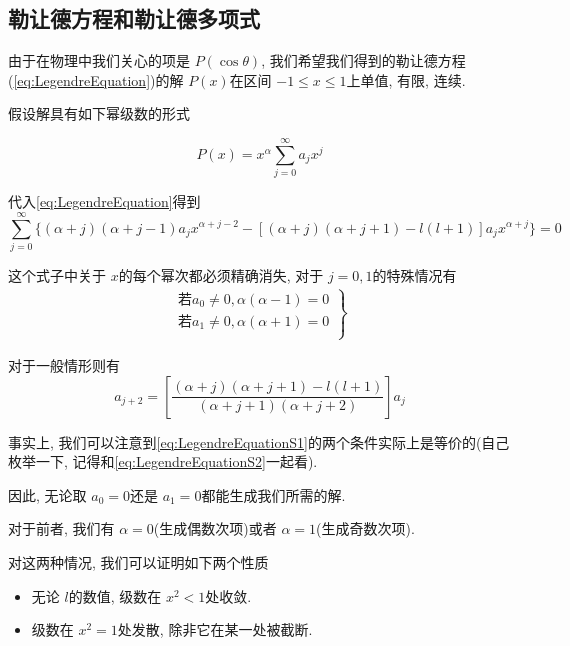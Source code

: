\subsection{勒让德方程和勒让德多项式}

由于在物理中我们关心的项是 $P(\cos\theta)$, 我们希望我们得到的勒让德方程(\cref{eq:LegendreEquation})的解 $P(x)$在区间 $-1\le x\le 1$上单值, 有限, 连续.

假设解具有如下幂级数的形式

\begin{equation}
    P(x) = x^\alpha\sum_{j=0}^{\infty} a_j x^j\label{eq:LegendreEquationAssumption}
\end{equation}

代入\cref{eq:LegendreEquation}得到
\begin{equation}
    \sum_{j=0}^{\infty} \{(\alpha+j)(\alpha+j-1)a_jx^{\alpha+j-2}-[(\alpha+j)(\alpha+j+1)-l(l+1)]a_jx^{\alpha+j}\} = 0\label{eq:LegendreEquationS0}
\end{equation}

这个式子中关于 $x$的每个幂次都必须精确消失, 对于 $j=0,1$的特殊情况有
\begin{equation}
    \begin{split}
        \left. 
        \begin{array}{r}
            \text{若}a_0\ne 0, \alpha \left( \alpha -1 \right) =0\\
            \text{若}a_1\ne 0, \alpha \left( \alpha +1 \right) =0\\
        \end{array} 
        \right\} 
    \end{split}\label{eq:LegendreEquationS1}
\end{equation}

对于一般情形则有
\begin{equation}
    a_{j+2} = \left[ \frac{(\alpha+j)(\alpha+j+1)-l(l+1)}{(\alpha+j+1)(\alpha+j+2)} \right]a_j \label{eq:LegendreEquationS2}
\end{equation}

事实上, 我们可以注意到\cref{eq:LegendreEquationS1}的两个条件实际上是等价的(自己枚举一下, 记得和\cref{eq:LegendreEquationS2}一起看).

因此, 无论取 $a_0=0$还是 $a_1=0$都能生成我们所需的解.

对于前者, 我们有 $\alpha = 0$(生成偶数次项)或者 $\alpha = 1$(生成奇数次项).

对这两种情况, 我们可以证明如下两个性质
\begin{itemize}
    \item 无论 $l$的数值, 级数在 $x^2<1$处收敛.
    \item 级数在 $x^2=1$处发散, 除非它在某一处被截断.
\end{itemize}

